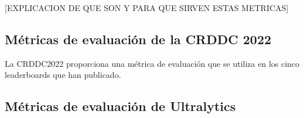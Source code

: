 [EXPLICACION DE QUE SON Y PARA QUE SIRVEN ESTAS METRICAS]

\subsection{Métricas de evaluación de la CRDDC 2022}
La CRDDC2022 proporciona una métrica de evaluación que se utiliza en los cinco leaderboards que han publicado.

\subsection{Métricas de evaluación de Ultralytics}